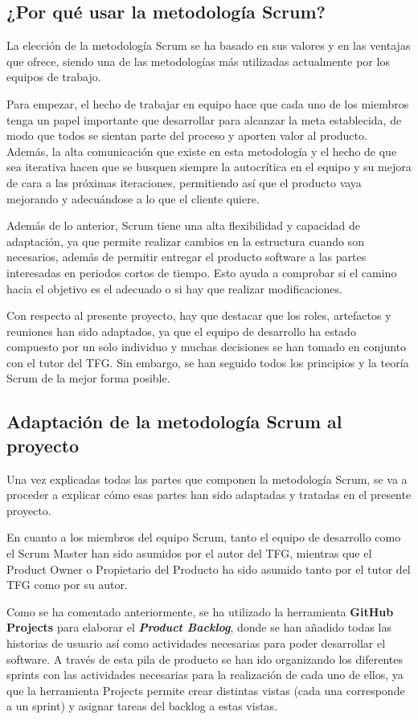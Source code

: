 \subsection{¿Por qué usar la metodología Scrum?}

La elección de la metodología Scrum se ha basado en sus valores y en las ventajas que ofrece, siendo una de las
metodologías más utilizadas actualmente por los equipos de trabajo.

Para empezar, el hecho de trabajar en equipo hace que cada uno de los miembros tenga un papel importante que desarrollar
para alcanzar la meta establecida, de modo que todos se sientan parte del proceso y aporten valor al producto.
Además, la alta comunicación que existe en esta metodología y el hecho de que sea iterativa hacen que se busquen siempre
la autocrítica en el equipo y su mejora de cara a las próximas iteraciones, permitiendo así que el producto
vaya mejorando y adecuándose a lo que el cliente quiere.

Además de lo anterior, Scrum tiene una alta flexibilidad y capacidad de adaptación, ya que permite realizar cambios en la estructura
cuando son necesarios, además de permitir entregar el producto software a las partes interesadas en periodos cortos
de tiempo. Esto ayuda a comprobar si el camino hacia el objetivo es el adecuado o si hay que realizar modificaciones.

Con respecto al presente proyecto, hay que destacar que los roles, artefactos y reuniones han sido adaptados, ya que el equipo
de desarrollo ha estado compuesto por un solo individuo y muchas decisiones se han tomado en conjunto con el tutor del TFG.
Sin embargo, se han seguido todos los principios y la teoría Scrum de la mejor forma posible.

\subsection{Adaptación de la metodología Scrum al proyecto}

Una vez explicadas todas las partes que componen la metodología Scrum, se va a proceder a explicar cómo esas partes han
sido adaptadas y tratadas en el presente proyecto.

En cuanto a los miembros del equipo Scrum, tanto el equipo de desarrollo como el Scrum Master han sido asumidos por el autor del TFG, mientras
que el Product Owner o Propietario del Producto ha sido asumido tanto por el tutor del TFG como por su autor.

Como se ha comentado anteriormente, se ha utilizado la herramienta \textbf{GitHub Projects} \cite{githubProjects} para elaborar
el \textbf{\textit{Product Backlog}}, donde se han añadido todas las historias de usuario así como actividades necesarias
para poder desarrollar el software. A través de esta pila de producto se han ido organizando los diferentes sprints con
las actividades necesarias para la realización de cada uno de ellos, ya que la herramienta Projects permite crear distintas
vistas (cada una corresponde a un sprint) y asignar tareas del backlog a estas vistas. 

